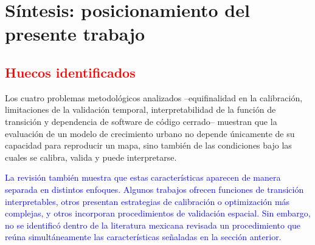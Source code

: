 
%


\section{Síntesis: posicionamiento del presente trabajo}
\label{sec:sintesis-estado-arte}

\subsection{\textcolor{red}{Huecos identificados}}

Los cuatro problemas metodológicos analizados --equifinalidad en la
calibración, limitaciones de la validación temporal, interpretabilidad de la
función de transición y dependencia de software de código cerrado-- muestran
que la evaluación de un modelo de crecimiento urbano no depende únicamente de
su capacidad para reproducir un mapa, sino también de las condiciones bajo
las cuales se calibra, valida y puede interpretarse.

\textcolor{blue}{La revisión también muestra que estas características aparecen
de manera separada en distintos enfoques. Algunos trabajos ofrecen funciones
de transición interpretables, otros presentan estrategias de calibración o
optimización más complejas, y otros incorporan procedimientos de validación
espacial. Sin embargo, no se identificó dentro de la literatura mexicana
revisada un procedimiento que reúna simultáneamente las características
señaladas en la sección anterior.}

